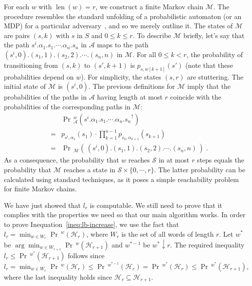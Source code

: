 \documentclass[final,3p,times,twocolumn]{elsarticle}
\theoremstyle{plain}
\theoremstyle{definition}
\newcommand{\state}{s}
\newcommand{\states}{S}
\newcommand{\initstate}{\state^{i}}
\newcommand{\reachset}{\mathcal{S}}
\newcommand{\sys}{\mathcal{A}}
\newcommand{\prob}[3]{p_{{#1},{#2}}(#3)}
\newcommand{\smbol}{\alpha}
\newcommand{\plength}{n}
\newcommand{\extension}[1]{{#1}^{\uparrow}}
\newcommand{\fword}{w}
\newcommand{\phit}{\mathcal{H}}
\DeclareMathOperator{\lenWord}{len}
\newcommand{\len}[1]{\lenWord({#1})}
\DeclareMathOperator{\prWord}{Pr}
\newcommand{\lb}{l}
\newcommand{\iter}{r}
\newcommand{\finmc}{\mathcal{M}}
\newcommand{\wprefix}[2]{\text{${#1}\!\!\downarrow\!\!{#2}$}}
\newcommand{\recallInequation}[1]{Inequation~\ref{#1}}
\newcommand{\pr}{\prWord\,\!}
\begin{document}
For each $\fword$ with $\len{\fword} = \iter$, we construct a finite Markov
chain $\finmc$. The procedure resembles the standard unfolding of a
probabilistic automaton (or an MDP) for a particular
adversary~\cite{thesis:segala}, and so we merely outline it. The states of
$\finmc$ are pairs $(\state,k)$ with $\state$ in $\states$
and $0 \leq k \leq \iter$. To describe $\finmc$ briefly, let's say that
the path
$\initstate.\smbol_{1}.\state_{1}.\cdots.\smbol_{\plength}.\state_{\plength}$
in $\sys$ maps to the path
$(\initstate,0).(\state_{1},1).(\state_{2},2).
						\cdots.(\state_{\plength},\plength)$ in $\finmc$.
For all $0 \leq k < \iter$, the probability of transitioning
from $(\state,k)$ to $(\state',k+1)$ is $\prob{\state}{\fword[k+1]}{\state'}$
(note that these probabilities depend on $\fword$). For simplicity, the states
$(\state,\iter)$ are stuttering. The initial state of $\finmc$ is
$(\initstate,0)$. The previous definitions for $\finmc$ imply that the
probabilities of the paths in $\sys$ having length at most $\iter$ coincide
with the probabilities of the corresponding paths in $\finmc$:
\[
\begin{array}{rcl}
& & \pr^{\fword}_{\sys}(\extension{\initstate.\smbol_{1}.\state_{1}.
		\cdots.\smbol_{\plength}.\state_{\plength}}) \\
	& = & \prob{\initstate}{\smbol_{1}}{\state_{1}} \cdot 
		\prod_{k=1}^{\plength-1} \prob{\state_{k}}{\smbol_{k+1}}{\state_{k+1}}\\
	& = & \pr_{\finmc}( \, (\initstate,0).(\state_{1},1).(\state_{2},2).
							\cdots.(\state_{\plength},\plength) \, ) \; .
\end{array}
\]
As a consequence, the probability that $w$ reaches $\reachset$ in
at most $\iter$ steps equals the probability that $\finmc$ reaches a state in
$\reachset \times \{ 0, \cdots, \iter \}$. The latter probability can be
calculated using standard techniques, as it poses a simple reachability
problem for finite Markov chains.

We have just showed that $\lb_{\iter}$ is computable. We still need to prove
that it complies with the properties we need so that our main algorithm works.
In order to prove \recallInequation{ineq:lb-increase}, we use the fact
that $\lb_{\iter} = \min_{\fword \in W_{\iter}} \pr^{\fword}(\phit_{\iter})$,
where $W_{\iter}$ is the set of all words of length $\iter$. Let $\fword^{*}$ be
$\arg \min_{\fword \in W_{\iter+1}} \pr^{\fword}(\phit_{\iter+1})$
and $\fword^{*-1}$ be $\wprefix{\fword^{*}}{\iter}$. The required inequality
$\lb_{\iter} \leq \pr^{\fword^{*}}(\phit_{\iter+1})$ follows since
$\lb_{\iter} = \min_{\fword \in W_{\iter}} \pr^{\fword}(\phit_{\iter})
		\leq \pr^{\fword^{*-1}}(\phit_{\iter})
		= \pr^{\fword^{*}}(\phit_{\iter})
		\leq \pr^{\fword^{*}}(\phit_{\iter+1})$,
where the last inequality holds since
$\phit_{\iter} \subseteq \phit_{\iter+1}$.
\end{document}
